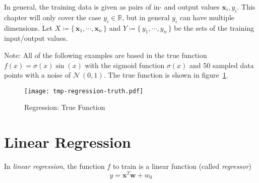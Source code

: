 \documentclass[a4paper, 11pt, accentcolor = tud3b]{tudreport}
\newcommand{\R}{\ensuremath{\mathbb{R}}}
\renewcommand{\vec}[1]{\mathbf{#1}}
\begin{document}
		In general, the training data is given as pairs of in- and output values \( \vec{x}_i, y_i \). This chapter will only cover the case \( y_i \in \R \), but in general \(y_i\) can have multiple dimensions. Let \( X \coloneqq \{\, \vec{x}_1, \cdots, \vec{x}_n \,\} \) and \( Y \coloneqq \{\, y_1, \cdots, y_n \,\} \) be the sets of the training input/output values.

		Note: All of the following examples are based in the true function \( f(x) = \sigma(x) \sin(x) \) with the sigmoid function \( \sigma(x) \) and 50 sampled data points with a noise of \( \mathcal{N}\,(0, 1) \). The true function is shown in figure~\ref{fig:regressionTrue}.
		
		\begin{figure}
			\centering
			\texttt{[image: tmp-regression-truth.pdf]}
			\caption{Regression: True Function}
			\label{fig:regressionTrue}
		\end{figure}

		\section{Linear Regression}
			In \emph{linear regression}, the function \(f\) to train is a linear function (called \emph{regressor})
			\begin{equation}
				y = \vec{x}^T \vec{w} + w_0
			\end{equation}
\end{document}
